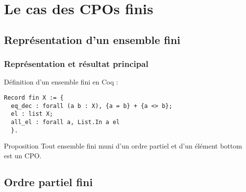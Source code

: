 \documentclass{beamer}
\begin{document}







\section{Le cas des CPOs finis}

\subsection{Représentation d'un ensemble fini}
\label{finis}

\begin{frame}[fragile]
\frametitle{Représentation et résultat principal}

Définition d'un ensemble fini en Coq :

\begin{lstlisting}[frame=single, language = Coq, basicstyle=\scriptsize]
Record fin X := {
  eq_dec : forall (a b : X), {a = b} + {a <> b};
  el : list X;
  all_el : forall a, List.In a el
  }.
\end{lstlisting}

\begin{alertblock}{Proposition}
Tout ensemble fini muni d'un ordre partiel et d'un élément bottom est un CPO.
\end{alertblock}



\end{frame}


\subsection{Ordre partiel fini}
\label{ordrepartiel}

\end{document}
